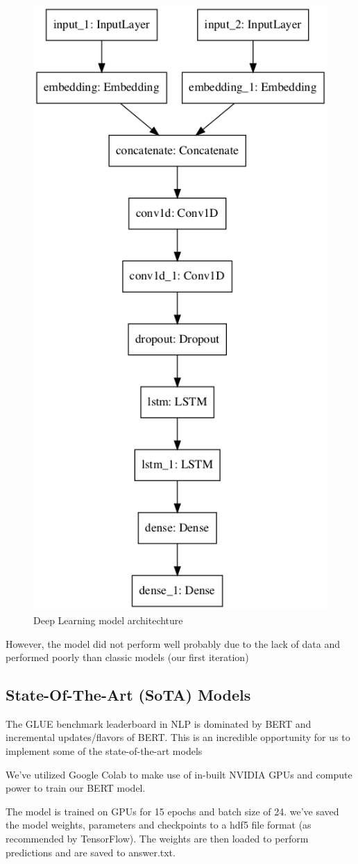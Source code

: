 \documentclass[conference]{IEEEtran}
\begin{document}
\begin{figure}[htbp]
\centerline{\includegraphics[width=0.5\columnwidth]{model.png}}
\caption{Deep Learning model architechture}
\label{fig1}
\end{figure}

However, the model did not perform well probably due to the lack of data and performed poorly than classic models (our first iteration)

\subsection{State-Of-The-Art (SoTA) Models}

The GLUE benchmark leaderboard in NLP is dominated by BERT and incremental updates/flavors of BERT. This is an incredible opportunity for us to implement some of the state-of-the-art models 

We’ve utilized Google Colab to make use of in-built NVIDIA GPUs and compute power to train our BERT model.

The model is trained on GPUs for 15 epochs and batch size of 24. we’ve saved the model weights, parameters and checkpoints to a hdf5 file format (as recommended by TensorFlow). The weights are then loaded to perform predictions and are saved to answer.txt.
\end{document}
